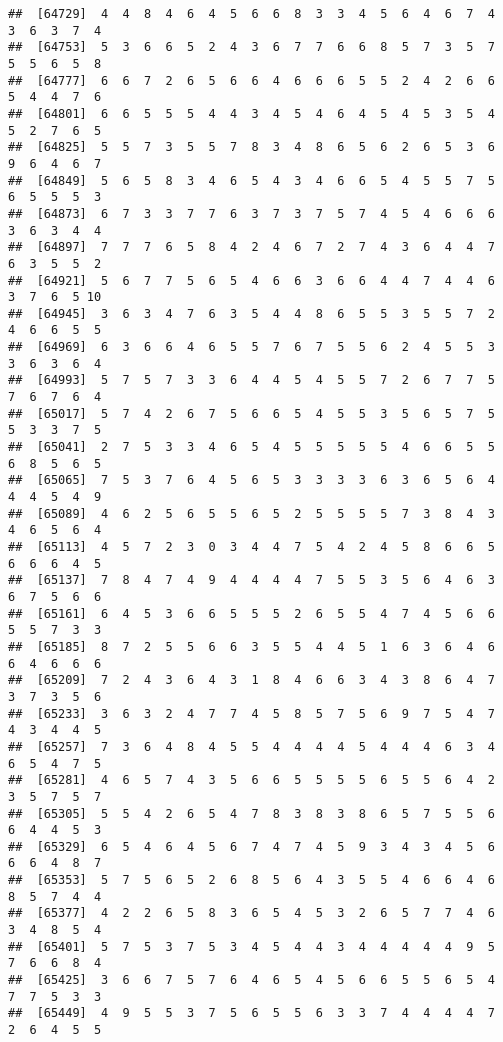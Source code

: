 \documentclass[
]{book}
\begin{document}
\begin{verbatim}
##  [64729]  4  4  8  4  6  4  5  6  6  8  3  3  4  5  6  4  6  7  4  3  6  3  7  4
##  [64753]  5  3  6  6  5  2  4  3  6  7  7  6  6  8  5  7  3  5  7  5  5  6  5  8
##  [64777]  6  6  7  2  6  5  6  6  4  6  6  6  5  5  2  4  2  6  6  5  4  4  7  6
##  [64801]  6  6  5  5  5  4  4  3  4  5  4  6  4  5  4  5  3  5  4  5  2  7  6  5
##  [64825]  5  5  7  3  5  5  7  8  3  4  8  6  5  6  2  6  5  3  6  9  6  4  6  7
##  [64849]  5  6  5  8  3  4  6  5  4  3  4  6  6  5  4  5  5  7  5  6  5  5  5  3
##  [64873]  6  7  3  3  7  7  6  3  7  3  7  5  7  4  5  4  6  6  6  3  6  3  4  4
##  [64897]  7  7  7  6  5  8  4  2  4  6  7  2  7  4  3  6  4  4  7  6  3  5  5  2
##  [64921]  5  6  7  7  5  6  5  4  6  6  3  6  6  4  4  7  4  4  6  3  7  6  5 10
##  [64945]  3  6  3  4  7  6  3  5  4  4  8  6  5  5  3  5  5  7  2  4  6  6  5  5
##  [64969]  6  3  6  6  4  6  5  5  7  6  7  5  5  6  2  4  5  5  3  3  6  3  6  4
##  [64993]  5  7  5  7  3  3  6  4  4  5  4  5  5  7  2  6  7  7  5  7  6  7  6  4
##  [65017]  5  7  4  2  6  7  5  6  6  5  4  5  5  3  5  6  5  7  5  5  3  3  7  5
##  [65041]  2  7  5  3  3  4  6  5  4  5  5  5  5  5  4  6  6  5  5  6  8  5  6  5
##  [65065]  7  5  3  7  6  4  5  6  5  3  3  3  3  6  3  6  5  6  4  4  4  5  4  9
##  [65089]  4  6  2  5  6  5  5  6  5  2  5  5  5  5  7  3  8  4  3  4  6  5  6  4
##  [65113]  4  5  7  2  3  0  3  4  4  7  5  4  2  4  5  8  6  6  5  6  6  6  4  5
##  [65137]  7  8  4  7  4  9  4  4  4  4  7  5  5  3  5  6  4  6  3  6  7  5  6  6
##  [65161]  6  4  5  3  6  6  5  5  5  2  6  5  5  4  7  4  5  6  6  5  5  7  3  3
##  [65185]  8  7  2  5  5  6  6  3  5  5  4  4  5  1  6  3  6  4  6  6  4  6  6  6
##  [65209]  7  2  4  3  6  4  3  1  8  4  6  6  3  4  3  8  6  4  7  3  7  3  5  6
##  [65233]  3  6  3  2  4  7  7  4  5  8  5  7  5  6  9  7  5  4  7  4  3  4  4  5
##  [65257]  7  3  6  4  8  4  5  5  4  4  4  4  5  4  4  4  6  3  4  6  5  4  7  5
##  [65281]  4  6  5  7  4  3  5  6  6  5  5  5  5  6  5  5  6  4  2  3  5  7  5  7
##  [65305]  5  5  4  2  6  5  4  7  8  3  8  3  8  6  5  7  5  5  6  6  4  4  5  3
##  [65329]  6  5  4  6  4  5  6  7  4  7  4  5  9  3  4  3  4  5  6  6  6  4  8  7
##  [65353]  5  7  5  6  5  2  6  8  5  6  4  3  5  5  4  6  6  4  6  8  5  7  4  4
##  [65377]  4  2  2  6  5  8  3  6  5  4  5  3  2  6  5  7  7  4  6  3  4  8  5  4
##  [65401]  5  7  5  3  7  5  3  4  5  4  4  3  4  4  4  4  4  9  5  7  6  6  8  4
##  [65425]  3  6  6  7  5  7  6  4  6  5  4  5  6  6  5  5  6  5  4  7  7  5  3  3
##  [65449]  4  9  5  5  3  7  5  6  5  5  6  3  3  7  4  4  4  4  7  2  6  4  5  5

\end{verbatim}
\end{document}
